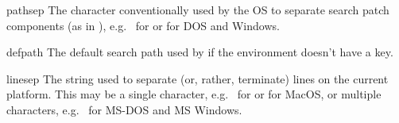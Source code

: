 \begin{datadesc}{pathsep}
The character conventionally used by the OS to separate search patch
components (as in ), e.g.\ \character{:} for \POSIX{} or
\character{;} for DOS and Windows.
\end{datadesc}

\begin{datadesc}{defpath}
The default search path used by  if the environment
doesn't have a  key.
\end{datadesc}

\begin{datadesc}{linesep}
The string used to separate (or, rather, terminate) lines on the
current platform.  This may be a single character,
e.g.\  for \POSIX{} or  for MacOS, or multiple
characters, e.g.\  for MS-DOS and MS Windows.
\end{datadesc}
